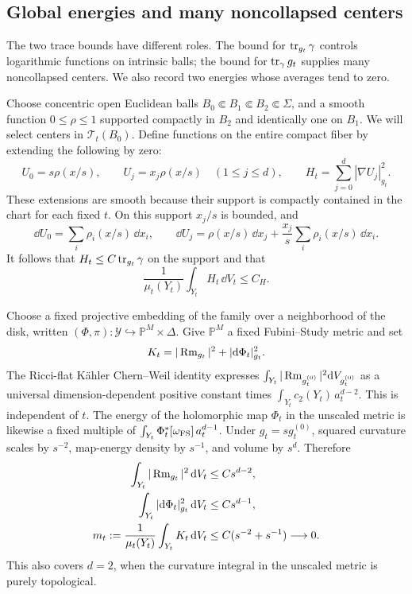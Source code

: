 \subsection{Global energies and many noncollapsed centers}

The two trace bounds have different roles.  The bound for
$\operatorname{tr}_{g_t}\gamma$ controls logarithmic functions on intrinsic balls;
the bound for $\operatorname{tr}_\gamma g_t$ supplies many noncollapsed centers.
We also record two energies whose averages tend to zero.

Choose concentric open Euclidean balls
$B_0\Subset B_1\Subset B_2\Subset\Sigma$, and a smooth function
$0\le\rho\le1$ supported compactly in $B_2$ and identically one on $B_1$.
We will select centers in $\mathcal T_t(B_0)$.  Define functions on
the entire compact fiber by extending the following by zero:
\begin{equation}
 U_0=s\rho(x/s),\qquad U_j=x_j\rho(x/s)\quad(1\le j\le d),
 \qquad H_t=\sum_{j=0}^d|\nabla U_j|_{g_t}^2.
 \label{eq:cutoff-functions}
\end{equation}
These extensions are smooth because their support is compactly
contained in the chart for each fixed $t$.  On this support $x_j/s$ is
bounded, and
\[
 \dd U_0=\sum_i\rho_i(x/s)\,\dd x_i,
 \qquad
 \dd U_j=\rho(x/s)\,\dd x_j
           +\frac{x_j}{s}\sum_i\rho_i(x/s)\,\dd x_i.
\]
It follows that $H_t\le C\operatorname{tr}_{g_t}\gamma$ on the support and that
\begin{equation}
 \frac1{\mu_t(Y_t)}\int_{Y_t}H_t\,\dd V_t\le C_H.
 \label{eq:cutoff-global-energy}
\end{equation}

Choose a fixed projective embedding of the family over a neighborhood
of the disk, written
$(\Phi,\pi):\mathcal Y\hookrightarrow\mathbb P^M\times\Delta$.
Give $\mathbb P^M$ a fixed Fubini--Study metric and set
\[
 K_t=|\operatorname{Rm}_{g_t}|^2+|\mathrm d\Phi_t|_{g_t}^2.
\]
The Ricci-flat K\"ahler Chern--Weil identity expresses
$\int_{Y_t}|\operatorname{Rm}_{g_t^{(0)}}|^2\mathrm d V_{g_t^{(0)}}$ as a
universal dimension-dependent positive constant times
$\int_{Y_t}c_2(Y_t)\,a_t^{d-2}$.  This is independent of $t$.
The energy of the holomorphic map $\Phi_t$ in the unscaled metric is
likewise a fixed multiple of
$\int_{Y_t}\Phi_t^*[\omega_{\rm FS}]\,a_t^{d-1}$.
Under $g_t=s g_t^{(0)}$, squared curvature scales by $s^{-2}$,
map-energy density by $s^{-1}$, and volume by $s^d$.  Therefore
\begin{equation}
 \begin{split}
 \int_{Y_t}|\operatorname{Rm}_{g_t}|^2\,\mathrm d V_t&\le C s^{d-2},\\
 \int_{Y_t}|\mathrm d\Phi_t|_{g_t}^2\,\mathrm d V_t&\le C s^{d-1},\\
 m_t:=\frac1{\mu_t(Y_t)}\int_{Y_t}K_t\,\mathrm d V_t
        &\le C(s^{-2}+s^{-1})\longrightarrow0.
 \end{split}
 \label{eq:small-global-energies}
\end{equation}
This also covers $d=2$, when the curvature integral in the unscaled
metric is purely topological.

